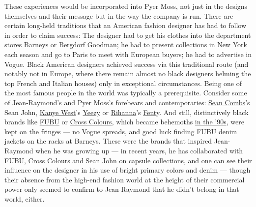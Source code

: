 These experiences would be incorporated into Pyer Moss, not just in the
designs themselves and their message but in the way the company is run.
There are certain long-held traditions that an American fashion designer
has had to follow in order to claim success: The designer had to get his
clothes into the department stores Barneys or Bergdorf Goodman; he had
to present collections in New York each season and go to Paris to meet
with European buyers; he had to advertise in Vogue. Black American
designers achieved success via this traditional route (and notably not
in Europe, where there remain almost no black designers helming the top
French and Italian houses) only in exceptional circumstances. Being one
of the most famous people in the world was typically a prerequisite.
Consider some of Jean-Raymond's and Pyer Moss's forebears and
contemporaries:
\href{https://www.nytimes3xbfgragh.onion/topic/person/sean-combs}{Sean
Combs}'s Sean John,
\href{https://www.nytimes3xbfgragh.onion/2015/04/10/t-magazine/kanye-west-adidas-yeezy-fashion-interview.html}{Kanye
West}'s
\href{https://www.nytimes3xbfgragh.onion/2016/02/11/t-magazine/fashion/kanye-west-yeezy-season-3-new-york-fashion-week-fall-2016.html}{Yeezy}
or
\href{https://www.nytimes3xbfgragh.onion/2015/10/12/t-magazine/rihanna-miranda-july-interview.html}{Rihanna}'s
\href{https://www.nytimes3xbfgragh.onion/interactive/2019/05/20/t-magazine/rihanna-fenty-louis-vuitton.html}{Fenty}.
And still, distinctively black brands like
\href{https://www.nytimes3xbfgragh.onion/1999/03/14/style/trying-to-stay-true-to-the-street.html}{FUBU}
or
\href{https://www.nytimes3xbfgragh.onion/1994/03/03/business/company-news-a-new-life-for-cross-colours.html}{Cross
Colours}, which became behemoths
\href{https://www.nytimes3xbfgragh.onion/2015/06/25/t-magazine/nas-fresh-dressed-style.html}{in
the '90s}, were kept on the fringes --- no Vogue spreads, and good luck
finding FUBU denim jackets on the racks at Barneys. These were the
brands that inspired Jean-Raymond when he was growing up --- in recent
years, he has collaborated with FUBU, Cross Colours and Sean John on
capsule collections, and one can see their influence on the designer in
his use of bright primary colors and denim --- though their absence from
the high-end fashion world at the height of their commercial power only
seemed to confirm to Jean-Raymond that he didn't belong in that world,
either.

